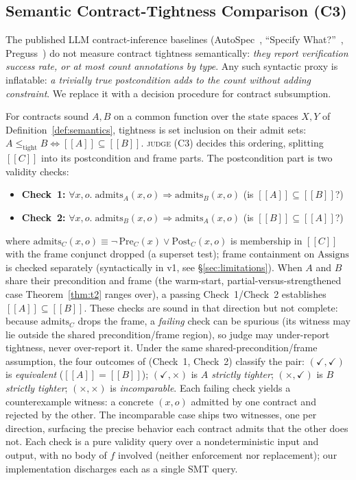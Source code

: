 \documentclass[conference]{IEEEtran}
\theoremstyle{definition}
\theoremstyle{remark}
\newcommand{\sem}[1]{[\![#1]\!]}
\begin{document}
\subsection{Semantic Contract-Tightness Comparison (C3)}\label{sec:judge}

The published LLM contract-inference baselines
(AutoSpec~\cite{wen2024autospec}, ``Specify
  What?''~\cite{granberry2024specifywhat},
Preguss~\cite{wang2025preguss}) do not measure contract tightness
semantically: \textit{they report verification success rate, or at
most count annotations by type}. Any such syntactic proxy is
inflatable: \textit{a trivially true postcondition adds to the count
without adding constraint}. We replace it with a decision procedure
for contract subsumption.

For contracts sound $A, B$ on a common function over the state spaces $X, Y$
of Definition~\ref{def:semantics}, tightness is set inclusion on their admit
sets: $A \le_{\text{tight}} B \iff \sem{A} \subseteq \sem{B}$. \textsc{judge}
(C3) decides this ordering, splitting $\sem{C}$ into its postcondition
and frame parts. The postcondition part is two validity checks:
\begin{itemize}
  \item \textbf{Check~1:}\;\; $\forall x, o.\; \text{admits}_A(x, o)
    \Rightarrow \text{admits}_B(x, o)$ \quad (is $\sem{A} \subseteq \sem{B}$?)
  \item \textbf{Check~2:}\;\; $\forall x, o.\; \text{admits}_B(x, o)
    \Rightarrow \text{admits}_A(x, o)$ \quad (is $\sem{B} \subseteq \sem{A}$?)
\end{itemize}
where $\text{admits}_C(x, o) \equiv \neg\,\text{Pre}_C(x) \lor
\text{Post}_C(x, o)$ is membership in $\sem{C}$ with the frame conjunct
dropped (a superset test); frame containment on $\text{Assigns}$ is
checked separately (syntactically in v1, see
\S\ref{sec:limitations}). When $A$ and $B$
share their precondition and frame (the warm-start,
partial-versus-strengthened case Theorem~\ref{thm:t2} ranges over), a
passing Check~1/Check~2 establishes $\sem{A}\subseteq\sem{B}$. These
checks are sound in that direction but not complete: because
$\text{admits}_C$ drops the frame, a \emph{failing} check can be
spurious (its witness may lie outside the shared precondition/frame
region), so judge may under-report tightness, never over-report it.
Under the same shared-precondition/frame assumption, the four outcomes
of (Check~1, Check~2) classify the pair: $(\checkmark, \checkmark)$
is \emph{equivalent}
($\sem{A} = \sem{B}$); $(\checkmark, \times)$ is \emph{$A$ strictly
tighter}; $(\times, \checkmark)$ is \emph{$B$ strictly tighter};
$(\times, \times)$ is \emph{incomparable}. Each failing check yields a
counterexample witness: a concrete $(x, o)$ admitted by one contract
and rejected by the other. The incomparable case ships two witnesses,
one per direction, surfacing the precise behavior each contract
admits that the other does not. Each check is a pure validity query
over a nondeterministic input and output, with no body of $f$
involved (neither enforcement nor replacement); our implementation
discharges each as a single SMT query.
\end{document}
